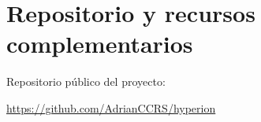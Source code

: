 \documentclass[12pt,oneside,spanish]{book}
\begin{document}
\chapter*{Repositorio y recursos complementarios}

Repositorio público del proyecto:

\url{https://github.com/AdrianCCRS/hyperion}





\end{document}
